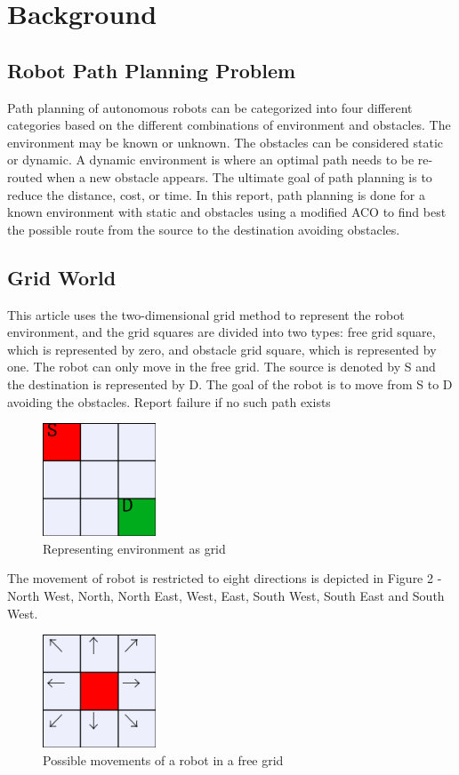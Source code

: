 \documentclass[conference]{IEEEtran}
\begin{document}
\section{Background}
\subsection{Robot Path Planning Problem}
Path planning of autonomous robots can be categorized into four different categories based on the different combinations of environment and obstacles. The environment may be known or unknown. The obstacles can be considered static or dynamic. A dynamic environment is where an optimal path needs to be re-routed when a new obstacle appears. The ultimate goal of path planning is to reduce the distance, cost, or time. In this report, path planning is done for a known environment with static and obstacles using a modified ACO to find best the possible route from the source to the destination avoiding obstacles. \cite{7823281}
\subsection{Grid World}
This article uses the two-dimensional grid method to represent the robot environment, and the grid squares are divided into two types: free grid square, which is represented by zero, and obstacle grid square, which is represented by one. The robot can only move in the free grid. \cite{1621617} The source is denoted by S and the destination is represented by D. The goal of the robot is to move from S to D avoiding the obstacles. Report failure if no such path exists
\begin{figure}[h!]
\centering
\includegraphics[width=0.3\textwidth]{EviormentGrid.png}
\caption{Representing environment as grid}
\label{fig}
\end{figure}
\newline
The movement of robot is restricted to eight directions is depicted in Figure 2 - North West, North, North East, West, East, South West, South East and South West. 
\begin{figure}[h!]
\centering
\includegraphics[width=0.3\textwidth]{AgentDirections.png}
\caption{Possible movements of a robot in a free grid}
\label{fig2}
\end{figure}
\end{document}
